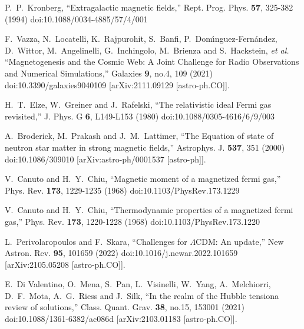 \documentclass[universe,article,submit,moreauthors,pdftex,a4paper]{Definitions/mdpi}
\begin{document}
\begin{thebibliography}{99}
P.~P.~Kronberg,
``Extragalactic magnetic fields,''
Rept. Prog. Phys. \textbf{57}, 325-382 (1994)
doi:10.1088/0034-4885/57/4/001

F.~Vazza, N.~Locatelli, K.~Rajpurohit, S.~Banfi, P.~Dom\'\i{}nguez-Fern\'andez, D.~Wittor, M.~Angelinelli, G.~Inchingolo, M.~Brienza and S.~Hackstein, \textit{et al.}
``Magnetogenesis and the Cosmic Web: A Joint Challenge for Radio Observations and Numerical Simulations,''
Galaxies \textbf{9}, no.4, 109 (2021)
doi:10.3390/galaxies9040109
[arXiv:2111.09129 [astro-ph.CO]].

H.~T.~Elze, W.~Greiner and J.~Rafelski,
``The relativistic ideal Fermi gas revisited,''
J. Phys. G \textbf{6}, L149-L153 (1980)
doi:10.1088/0305-4616/6/9/003

A.~Broderick, M.~Prakash and J.~M.~Lattimer,
``The Equation of state of neutron star matter in strong magnetic fields,''
Astrophys. J. \textbf{537}, 351 (2000)
doi:10.1086/309010
[arXiv:astro-ph/0001537 [astro-ph]].

V.~Canuto and H.~Y.~Chiu,
``Magnetic moment of a magnetized fermi gas,''
Phys. Rev. \textbf{173}, 1229-1235 (1968)
doi:10.1103/PhysRev.173.1229

V.~Canuto and H.~Y.~Chiu,
``Thermodynamic properties of a magnetized fermi gas,''
Phys. Rev. \textbf{173}, 1220-1228 (1968)
doi:10.1103/PhysRev.173.1220

L.~Perivolaropoulos and F.~Skara,
``Challenges for \ensuremath{\Lambda}CDM: An update,''
New Astron. Rev. \textbf{95}, 101659 (2022)
doi:10.1016/j.newar.2022.101659
[arXiv:2105.05208 [astro-ph.CO]].

E.~Di Valentino, O.~Mena, S.~Pan, L.~Visinelli, W.~Yang, A.~Melchiorri, D.~F.~Mota, A.~G.~Riess and J.~Silk,
``In the realm of the Hubble tension\textemdash{}a review of solutions,''
Class. Quant. Grav. \textbf{38}, no.15, 153001 (2021)
doi:10.1088/1361-6382/ac086d
[arXiv:2103.01183 [astro-ph.CO]].


\end{thebibliography}
\end{document}
